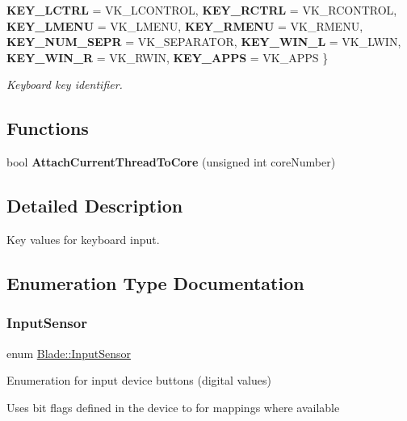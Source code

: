 \begin{DoxyCompactItemize}
{\bfseries K\+E\+Y\+\_\+\+L\+C\+T\+RL} = V\+K\+\_\+\+L\+C\+O\+N\+T\+R\+OL, 
{\bfseries K\+E\+Y\+\_\+\+R\+C\+T\+RL} = V\+K\+\_\+\+R\+C\+O\+N\+T\+R\+OL, 
{\bfseries K\+E\+Y\+\_\+\+L\+M\+E\+NU} = V\+K\+\_\+\+L\+M\+E\+NU, 
\newline
{\bfseries K\+E\+Y\+\_\+\+R\+M\+E\+NU} = V\+K\+\_\+\+R\+M\+E\+NU, 
{\bfseries K\+E\+Y\+\_\+\+N\+U\+M\+\_\+\+S\+E\+PR} = V\+K\+\_\+\+S\+E\+P\+A\+R\+A\+T\+OR, 
{\bfseries K\+E\+Y\+\_\+\+W\+I\+N\+\_\+L} = V\+K\+\_\+\+L\+W\+IN, 
{\bfseries K\+E\+Y\+\_\+\+W\+I\+N\+\_\+R} = V\+K\+\_\+\+R\+W\+IN, 
\newline
{\bfseries K\+E\+Y\+\_\+\+A\+P\+PS} = V\+K\+\_\+\+A\+P\+PS
 \}\begin{DoxyCompactList}\small\item\em Keyboard key identifier. \end{DoxyCompactList}
\end{DoxyCompactItemize}
\subsection*{Functions}
\begin{DoxyCompactItemize}
\item 
\mbox{\label{namespace_blade_af513a3e743818ae50beb39b9bd577eba}} 
bool {\bfseries Attach\+Current\+Thread\+To\+Core} (unsigned int core\+Number)
\end{DoxyCompactItemize}


\subsection{Detailed Description}
Key values for keyboard input. 

\subsection{Enumeration Type Documentation}
\mbox{\label{namespace_blade_a1ecca198b7e0afbe43139ec2b0db937c}} 
\subsubsection{\texorpdfstring{Input\+Sensor}{InputSensor}}
{\footnotesize\ttfamily enum \hyperlink{namespace_blade_a1ecca198b7e0afbe43139ec2b0db937c}{Blade\+::\+Input\+Sensor}}



Enumeration for input device buttons (digital values) 

Uses bit flags defined in the device to for mappings where available 